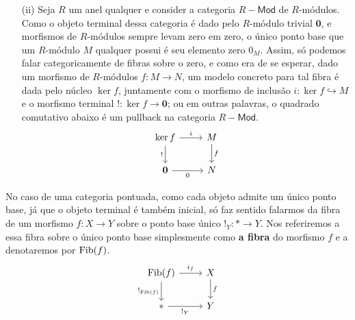 \begin{exem}
\begin{enumerate}
  \item[(ii)] Seja $R$ um anel qualquer e consider a categoria $R-\mathsf{Mod}$ de $R$-módulos.
    Como o objeto terminal dessa categoria é dado pelo $R$-módulo trivial $\mathbf{0}$, e morfismos de $R$-módulos sempre levam zero em zero, o único ponto base que um $R$-módulo $M$ qualquer possui é seu elemento zero $0_{M}$.
    Assim, só podemos falar categoricamente de fibras sobre o zero, e como era de se esperar, dado um morfismo de $R$-módulos $f: M \to N$, um modelo concreto para tal fibra é dada pelo núcleo $\ker f$, juntamente com o morfismo de inclusão $i: \ker f \hookrightarrow M$ e o morfismo terminal $!: \ker f \to \mathbf{0}$; ou em outras palavras, o quadrado comutativo abaixo é um pullback na categoria $R-\mathsf{Mod}$.
    \begin{displaymath}
      \begin{tikzcd}
        \ker f
        \arrow[r, "i"]
        \arrow[d, "!" swap]
        & M
        \arrow[d, "f"]
        \\ \mathbf{0}
        \arrow[r, "0" swap]
        & N
      \end{tikzcd}
    \end{displaymath}
  \end{enumerate}
\end{exem}

No caso de uma categoria pontuada, como cada objeto admite um único ponto base, já que o objeto terminal é também inicial, só faz sentido falarmos da fibra de um morfismo $f: X \to Y$ sobre o ponto base único $!_{Y}: * \to Y$.
Nos referiremos a essa fibra sobre o único ponto base simplesmente como \textbf{a fibra} do morfismo $f$ e a denotaremos por $\mathrm{Fib}(f)$.
\begin{displaymath}
  \begin{tikzcd}
    \Fib(f)
    \arrow[r, "i_{f}"]
    \arrow[d, "!_{\Fib(f)}" swap]
    & X
    \arrow[d, "f"]
    \\ *
    \arrow[r, "!_{Y}" swap]
    & Y
  \end{tikzcd}
\end{displaymath}

